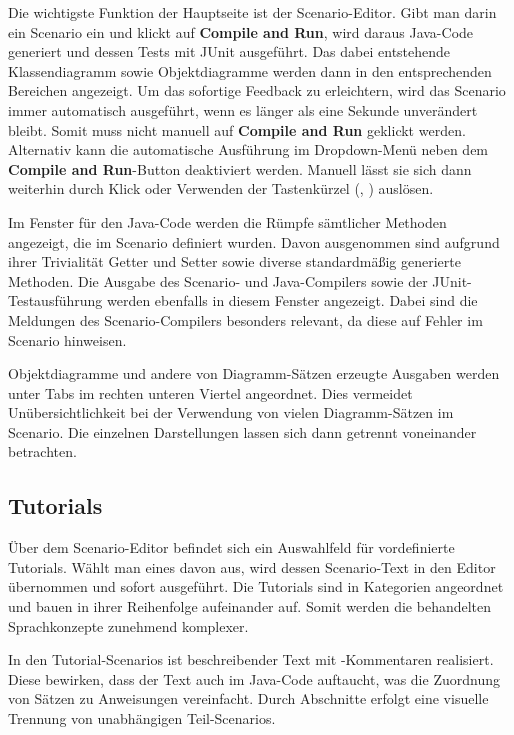 Die wichtigste Funktion der Hauptseite ist der Scenario-Editor.
Gibt man darin ein Scenario ein und klickt auf \textbf{Compile and Run}, wird daraus Java-Code generiert und dessen Tests mit JUnit ausgeführt.
Das dabei entstehende Klassendiagramm sowie Objektdiagramme werden dann in den entsprechenden Bereichen angezeigt.
Um das sofortige Feedback zu erleichtern, wird das Scenario immer automatisch ausgeführt, wenn es länger als eine Sekunde unverändert bleibt.
Somit muss nicht manuell auf \textbf{Compile and Run} geklickt werden.
Alternativ kann die automatische Ausführung im Dropdown-Menü neben dem \textbf{Compile and Run}-Button deaktiviert werden.
Manuell lässt sie sich dann weiterhin durch Klick oder Verwenden der Tastenkürzel (, ) auslösen.

Im Fenster für den Java-Code werden die Rümpfe sämtlicher Methoden angezeigt, die im Scenario definiert wurden.
Davon ausgenommen sind aufgrund ihrer Trivialität Getter und Setter sowie diverse standardmäßig generierte Methoden.
Die Ausgabe des Scenario- und Java-Compilers sowie der JUnit-Testausführung werden ebenfalls in diesem Fenster angezeigt.
Dabei sind die Meldungen des Scenario-Compilers besonders relevant, da diese auf Fehler im Scenario hinweisen.

Objektdiagramme und andere von Diagramm-Sätzen erzeugte Ausgaben werden unter Tabs im rechten unteren Viertel angeordnet.
Dies vermeidet Unübersichtlichkeit bei der Verwendung von vielen Diagramm-Sätzen im Scenario.
Die einzelnen Darstellungen lassen sich dann getrennt voneinander betrachten.

\subsection{Tutorials}\label{subsec:tutorials}

Über dem Scenario-Editor befindet sich ein Auswahlfeld für vordefinierte Tutorials.
Wählt man eines davon aus, wird dessen Scenario-Text in den Editor übernommen und sofort ausgeführt.
Die Tutorials sind in Kategorien angeordnet und bauen in ihrer Reihenfolge aufeinander auf.
Somit werden die behandelten Sprachkonzepte zunehmend komplexer.

In den Tutorial-Scenarios ist beschreibender Text mit \code{//}-Kommentaren realisiert.
Diese bewirken, dass der Text auch im Java-Code auftaucht, was die Zuordnung von Sätzen zu Anweisungen vereinfacht.
Durch Abschnitte erfolgt eine visuelle Trennung von unabhängigen Teil-Scenarios.

